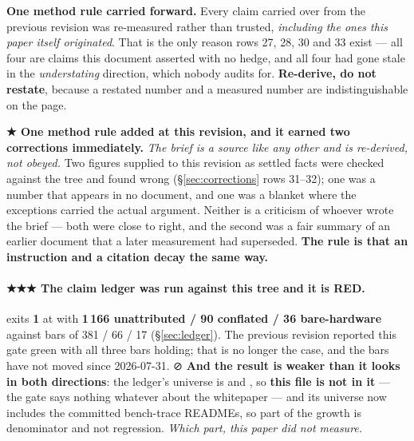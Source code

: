 \documentclass[10.5pt]{article}
\begin{document}
\textbf{One method rule carried forward.} Every claim carried over from the previous revision was
re-measured rather than trusted, \emph{including the ones this paper itself originated}. That is
the only reason rows 27, 28, 30 and 33 exist — all four are claims this document asserted with no
hedge, and all four had gone stale in the \emph{understating} direction, which nobody audits for.
\textbf{Re-derive, do not restate}, because a restated number and a measured number are
indistinguishable on the page.

\textbf{★ One method rule added at this revision, and it earned two corrections immediately.}
\emph{The brief is a source like any other and is re-derived, not obeyed.} Two figures supplied
to this revision as settled facts were checked against the tree and found wrong
(\S\ref{sec:corrections} rows 31--32); one was a number that appears in no document, and one was
a blanket where the exceptions carried the actual argument. Neither is a criticism of whoever
wrote the brief — both were close to right, and the second was a fair summary of an earlier
document that a later measurement had superseded. \textbf{The rule is that an instruction and a
citation decay the same way.}

\paragraph{★★★ The claim ledger was run against this tree and it is RED.}
 exits \textbf{1} at  with \textbf{1\,166
unattributed / 90 conflated / 36 bare-hardware} against bars of 381 / 66 / 17
(\S\ref{sec:ledger}). The previous revision reported this gate green with all three bars holding;
that is no longer the case, and the bars have not moved since 2026-07-31. ⊘ \textbf{And the result
is weaker than it looks in both directions}: the ledger's universe is  and ,
so \textbf{this file is not in it} — the gate says nothing whatever about the whitepaper — and its
universe now includes the committed bench-trace READMEs, so part of the growth is denominator and
not regression. \emph{Which part, this paper did not measure.}
\end{document}
